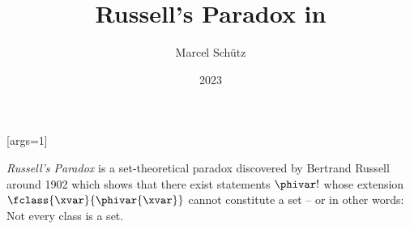 \documentclass{stex}
\title{Russell's Paradox in \Naproche}
\author{Marcel Schütz}
\date{2023}
\begin{document}
\maketitle

[args=1]{\maincomp{\varphi}}

\noindent \emph{Russell's Paradox} is a set-theoretical paradox discovered by Bertrand Russell around 1902 \cite[chapter XV]{Frege1980} which shows that there exist statements $\phivar!$ whose extension $\fclass{\xvar}{\phivar{\xvar}}$ cannot constitute a set – or in other words: Not every class is a set.


\printbibliography
\end{document}
